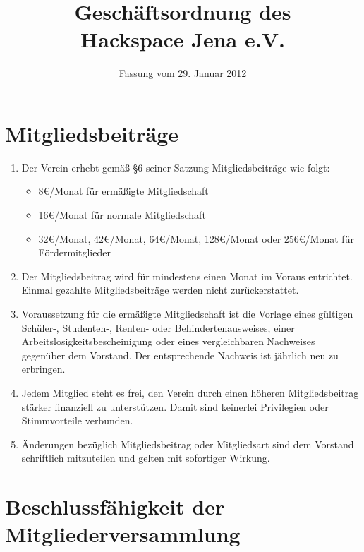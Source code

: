 \documentclass[fontsize=12pt,paper=a4,pagesize]{scrartcl}
\title{Geschäftsordnung des \\ Hackspace Jena e.V.}
\date{Fassung vom 29. Januar 2012}
\begin{document}
\maketitle{}

\section{Mitgliedsbeiträge}

\begin{enumerate}
    \item Der Verein erhebt gemäß §6 seiner Satzung Mitgliedsbeiträge wie
        folgt:
        \begin{itemize}
            \item 8\euro{}/Monat für ermäßigte Mitgliedschaft
            \item 16\euro{}/Monat für normale Mitgliedschaft
            \item 32\euro{}/Monat, 42\euro{}/Monat, 64\euro{}/Monat,
                  128\euro{}/Monat oder 256\euro{}/Monat für
                  Fördermitglieder
        \end{itemize}

    \item Der Mitgliedsbeitrag wird für mindestens einen Monat im Voraus
        entrichtet. Einmal gezahlte Mitgliedsbeiträge werden nicht
        zurückerstattet.

    \item Voraussetzung für die ermäßigte Mitgliedschaft ist die Vorlage
        eines gültigen Schüler-, Studenten-, Renten- oder
        Behindertenausweises, einer Arbeitslosigkeitsbescheinigung oder
        eines vergleichbaren Nachweises gegenüber dem Vorstand. Der
        entsprechende Nachweis ist jährlich neu zu erbringen.

    \item Jedem Mitglied steht es frei, den Verein durch einen höheren
        Mitgliedsbeitrag stärker finanziell zu unterstützen. Damit sind
        keinerlei Privilegien oder Stimmvorteile verbunden.

    \item Änderungen bezüglich Mitgliedsbeitrag oder Mitgliedsart sind dem
        Vorstand schriftlich mitzuteilen und gelten mit sofortiger Wirkung.
\end{enumerate}

\section{Beschlussfähigkeit der Mitgliederversammlung}
\end{document}
